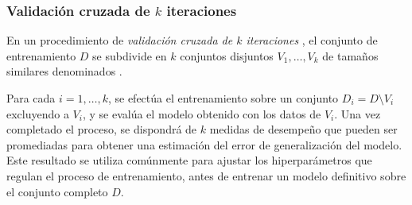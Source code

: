 %
\subsubsection{Validación cruzada de $k$ iteraciones}
%
En un procedimiento de \emph{validación cruzada de $k$ iteraciones}
\cite{crossval}, el conjunto de entrenamiento $D$ se subdivide en $k$
conjuntos disjuntos $V_1,\ldots,V_k$ de tamaños similares denominados
.

Para cada $i=1,\ldots,k$, se efectúa el entrenamiento sobre un
conjunto $D_i=D\setminus{}V_i$ excluyendo a $V_i$, y se evalúa el
modelo obtenido con los datos de $V_i$.  Una vez completado el
proceso, se dispondrá de $k$ medidas de desempeño que pueden ser
promediadas para obtener una estimación del error de generalización
del modelo. Este resultado se utiliza comúnmente para ajustar los
hiperparámetros que regulan el proceso de entrenamiento, antes de
entrenar un modelo definitivo sobre el conjunto completo $D$.

